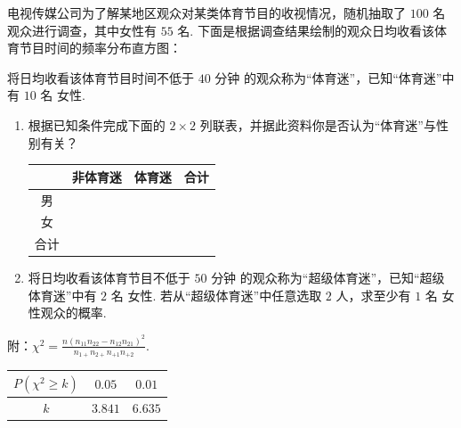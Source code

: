 \begin{problem}
电视传媒公司为了解某地区观众对某类体育节目的收视情况，随机抽取了 \(100\text{ 名}\) 观众进行调查，其中女性有 \(55\text{ 名}\). 下面是根据调查结果绘制的观众日均收看该体育节目时间的频率分布直方图：

将日均收看该体育节目时间不低于 \(40\text{ 分钟}\) 的观众称为“体育迷”，已知“体育迷”中有 \(10\text{ 名}\) 女性.

\begin{enumerate}
\item 根据已知条件完成下面的 \(2 \times 2\) 列联表，并据此资料你是否认为“体育迷”与性别有关？

\begin{center}
\begin{tabular}{|c|c|c|c|}
\hline
 & 非体育迷 & 体育迷 & 合计\\ \hline
男 & & & \\\hline
女 & & & \\\hline
合计 & & & \\\hline
\end{tabular}
\end{center}

\item 将日均收看该体育节目不低于 \(50\text{ 分钟}\) 的观众称为“超级体育迷”，已知“超级体育迷”中有 \(2\text{ 名}\) 女性. 若从“超级体育迷”中任意选取 \(2\text{ 人}\)，求至少有 \(1\text{ 名}\) 女性观众的概率.
\end{enumerate}

附：\(\chi^2 = \frac{n\left(n_{11}n_{22} - n_{12}n_{21}\right)^2}{n_{1+}n_{2+}n_{+1}n_{+2}}\).
\begin{center}
\begin{tabular}{c|cc}
\(P(\chi^2 \geqslant k)\) & \(0.05\) & \(0.01\) \\
\hline
\(k\) & \(3.841\) & \(6.635\)
\end{tabular}
\end{center}


\end{problem}

